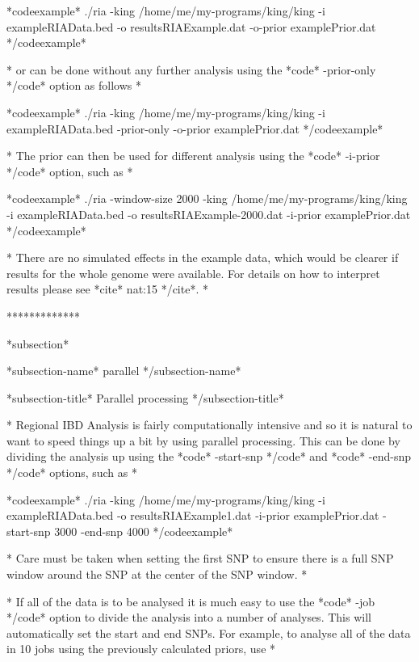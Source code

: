 *codeexample*
./ria -king /home/me/my-programs/king/king -i exampleRIAData.bed -o resultsRIAExample.dat -o-prior examplePrior.dat
*/codeexample*

*
or can be done without any further analysis using the *code* -prior-only */code* option as follows
*

*codeexample*
./ria -king /home/me/my-programs/king/king -i exampleRIAData.bed -prior-only -o-prior examplePrior.dat
*/codeexample*

*
The prior can then be used for different analysis using the *code* -i-prior */code* option, such as
*

*codeexample*
./ria -window-size 2000 -king /home/me/my-programs/king/king -i exampleRIAData.bed -o resultsRIAExample-2000.dat -i-prior examplePrior.dat
*/codeexample*

*
There are no simulated effects in the example data, which would be clearer if results for the whole genome were available. For details on how to interpret results please see *cite* nat:15 */cite*.
*

*************

*subsection*

*subsection-name* parallel */subsection-name*

*subsection-title* Parallel processing */subsection-title*

*
Regional IBD Analysis is fairly computationally intensive and so it is natural to want to speed things up a bit by using parallel processing. This can be done by dividing the analysis up using the *code* -start-snp */code* and *code* -end-snp */code* options, such as
*


*codeexample*
./ria -king /home/me/my-programs/king/king -i exampleRIAData.bed -o resultsRIAExample1.dat -i-prior examplePrior.dat -start-snp 3000 -end-snp 4000
*/codeexample*

*
Care must be taken when setting the first SNP to ensure there is a full SNP window around the SNP at the center of the SNP window.
*

*
If all of the data is to be analysed it is much easy to use the *code* -job */code* option to divide the analysis into a number of analyses. This will automatically set the start and end SNPs. For example, to analyse all of the data in 10 jobs using the previously calculated priors, use
*

